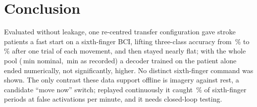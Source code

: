 \section{Conclusion}
\label{sec:conclusion}
Evaluated without leakage, one re-centred transfer configuration gave stroke
patients a fast start on a sixth-finger BCI, lifting three-class accuracy
from \rqTwoRestAhSfTsLrKOneMean\,\% to \rqTwoRestAhSfRctTslrKOneMean\,\% after
one trial of each movement, and then stayed nearly flat; with the whole pool
(\rqTwoMinutesKAll\,min nominal, \rqTwoMinutesRecordedKAll\,min as recorded)
a decoder trained on the patient alone ended numerically, not significantly,
higher. No distinct sixth-finger command was shown. The only contrast these
data support offline is imagery against rest, a candidate ``move now''
switch; replayed continuously it caught \exFiveFingerFingerOnMean\,\% of
sixth-finger periods at \exFiveFingerFalsePerMinMean{} false activations per
minute, and it needs closed-loop testing.
